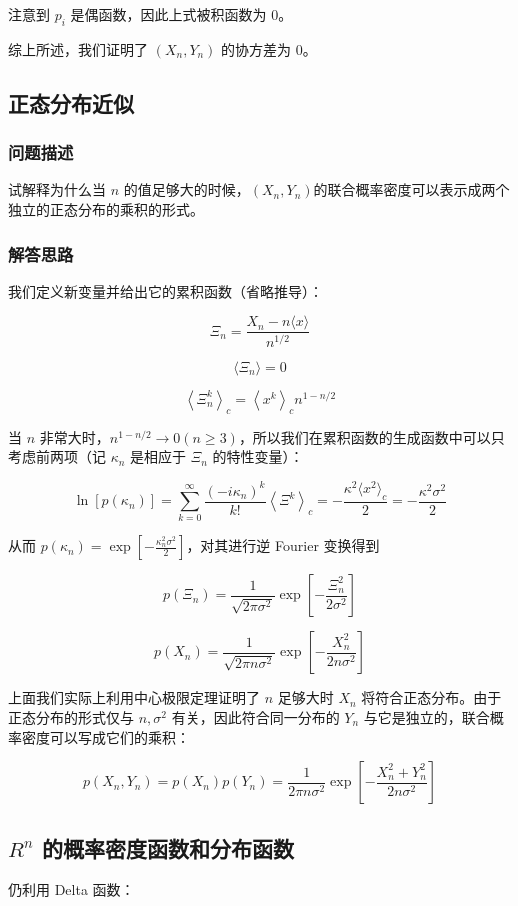 \documentclass{ctexart}
\begin{document}
注意到 $p_i$ 是偶函数，因此上式被积函数为 0。

综上所述，我们证明了 $(X_n,Y_n)$ 的协方差为 0。
\subsection{正态分布近似}

\subsubsection{问题描述}
试解释为什么当 $n$ 的值足够大的时候，$(X_n,Y_n)$的联合概率密度可以表示成两个独立的正态分布的乘积的形式。
\subsubsection{解答思路}
我们定义新变量并给出它的累积函数（省略推导）：

$$
\Xi_n=\frac{X_n-n\langle x\rangle}{n^{1 / 2}}
$$

$$
\langle \Xi_n\rangle=0
$$

$$
\left\langle \Xi_n^{k}\right\rangle_{c}=\left\langle x^{k}\right\rangle_{c} n^{1-n / 2}
$$

当 $n$ 非常大时，$n^{1-n / 2}\to0(n\ge3)$，所以我们在累积函数的生成函数中可以只考虑前两项（记 $\kappa_n$ 是相应于 $\Xi_n$ 的特性变量）：

$$
\ln [p(\kappa_n)]=\sum_{k=0}^{\infty} \frac{(-i\kappa_n)^{k}}{k !}\left\langle \Xi^{k}\right\rangle_{c}=-\frac{\kappa^2\langle x^2\rangle_c}{2}=-\frac{\kappa^2\sigma^2}{2}
$$

从而 $p(\kappa_n)=\exp[-\frac{\kappa_n^2\sigma^2}{2}]$，对其进行逆 Fourier 变换得到

$$
p(\Xi_n)=\frac1{\sqrt{2\pi\sigma^2}}\exp[-\frac{\Xi_n^2}{2\sigma^2}]
$$

$$
p(X_n)=\frac1{\sqrt{2\pi n\sigma^2}}\exp[-\frac{X_n^2}{2n\sigma^2}]
$$

上面我们实际上利用中心极限定理证明了 $n$ 足够大时 $X_n$ 将符合正态分布。由于正态分布的形式仅与 $n,\sigma^2$ 有关，因此符合同一分布的 $Y_n$ 与它是独立的，联合概率密度可以写成它们的乘积：

$$
p(X_n,Y_n)=p(X_n)p(Y_n)=\frac{1}{2\pi n\sigma^2}\exp[-\frac{X_n^2+Y_n^2}{2n\sigma^2}]
$$

\subsection{$R^n$ 的概率密度函数和分布函数}

仍利用 Delta 函数：
\end{document}
